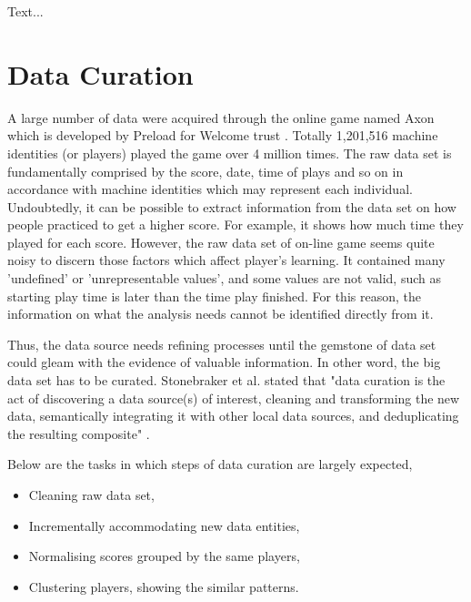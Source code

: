 \documentclass[12pt,a4paper]{report}
\begin{document}

Text...



\chapter{Data Curation}
A large number of data were acquired through the online game named Axon which is developed by Preload for Welcome trust \cite{stuart2009Axon}. Totally 1,201,516 machine identities (or players) played the game over 4 million times. The raw data set is fundamentally comprised by the score, date, time of plays and so on in accordance with machine identities which may represent each individual. %
Undoubtedly, it can be possible to extract information from the data set on how people practiced to get a higher score. For example, it shows how much time they played for each score. 
However, the raw data set of on-line game seems quite noisy to discern those factors which affect player's learning. It contained many 'undefined' or 'unrepresentable values', and some values are not valid, such as starting play time is later than the time play finished. For this reason, the information on what the analysis needs cannot be identified directly from it.

Thus, the data source needs refining processes until the gemstone of data set could gleam with the evidence of valuable information. In other word, the big data set has to be curated. Stonebraker et al. stated that "data curation is the act of discovering a data source(s) of interest, cleaning and transforming the new data, semantically integrating it with other local data sources, and deduplicating the resulting composite" \cite{stonebraker2013data}.

\bigskip
Below are the tasks in which steps of data curation are largely expected,

\begin{itemize}
	\item Cleaning raw data set,
	\item Incrementally accommodating new data entities,
	\item Normalising scores grouped by the same players,
	\item Clustering players, showing the similar patterns.
\end{itemize}
\end{document}
